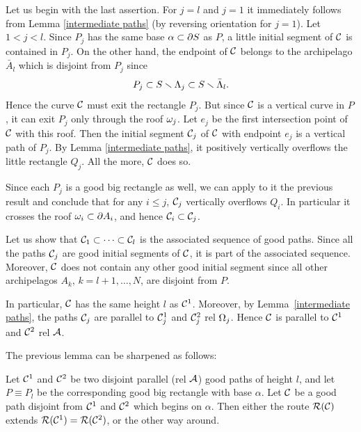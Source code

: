 \begin{pf}
Let us begin with the last assertion. 
For $j=l$ and $j=1$ it immediately follows from Lemma \ref{intermediate paths}
(by reversing orientation for $j=1$).
Let $1<j <l$. 
 Since $P_j$ has the same base $\alpha\subset \partial S$ as $P$,
a little initial segment of ${\cal C}$ is contained in $P_j$.
On the other hand, the endpoint of ${\cal C}$ belongs to the archipelago $\bar A_l$
which is disjoint from  $P_j$ since
$$ 
     P_j\subset S\smallsetminus {\Lambda}_j \subset S\smallsetminus \bar {{\Lambda}}_l.
 $$  
Hence the curve ${\cal C}$ must exit the rectangle $P_j$.
But since  ${\cal C}$  is a vertical curve in $P$, it can exit $P_j$ only through the roof ${\omega}_j$. 
Let $e_j$ be the first intersection point of ${\cal C}$ with this roof. 
Then the initial segment ${\cal C}_j$ of ${\cal C}$ with endpoint $e_j$ is a vertical path of $P_j$.    
By Lemma \ref{intermediate paths}, it positively vertically overflows the little rectangle $Q_j$.
All the more, ${\cal C}$ does so. 

Since each $P_j$ is a good big rectangle as well, we can apply to it the previous result
and conclude that for any $i\leq j$, ${\cal C}_j$ vertically overflows $Q_i$.
In particular it crosses the roof ${\omega}_i\subset \partial A_i$, and hence ${\cal C}_i\subset {\cal C}_j$.  

Let us show that ${\cal C}_1\subset\dots \subset {\cal C}_l$ is the associated sequence of good paths. 
Since all the paths ${\cal C}_j$ are good initial segments of ${\cal C}$, 
it is  part of the associated sequence.
Moreover, ${\cal C}$ does not contain any other good initial segment since all other 
archipelagos $A_k$, $k=l+1, \dots, N$, are disjoint from $P$.  

In particular, ${\cal C}$ has the same height $l$ as ${\cal C}^1$.
Moreover, by Lemma~\ref{intermediate paths}, the paths  ${\cal C}_j$ are parallel to ${\cal C}^1_j$ and ${\cal C}^2_j$
rel ${\Omega}_j$. Hence ${\cal C}$ is parallel to ${\cal C}^1$ and ${\cal C}^2$ rel ${\cal A}$. 
\end{pf}


The previous lemma can be sharpened as follows: 

\begin{lem}\label{good rectangles-2}
Let ${\cal C}^1$ and ${\cal C}^2$ be two disjoint parallel (rel ${\cal A}$) good paths of height $l$, 
and let $P\equiv P_l$ be the corresponding  good big rectangle with base $\alpha$.
Let ${\cal C}$ be a good path disjoint from ${\cal C}^1$ and ${\cal C}^2$ which begins on $\alpha$. 
Then  either the  route ${\cal R}({\cal C})$  extends ${\cal R}({\cal C}^1)={\cal R}({\cal C}^2)$, or the other way around. 
\end{lem}

